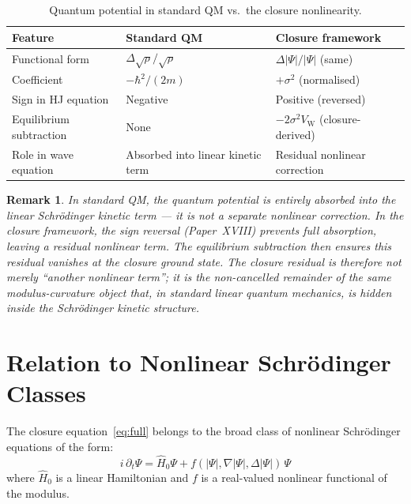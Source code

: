 \documentclass[12pt]{article}
\newtheorem{remark}[theorem]{Remark}
\newcommand{\VW}{V_{\mathrm{W}}}
\begin{document}
\begin{table}[ht]
\centering
\caption{Quantum potential in standard QM vs.\ the closure nonlinearity.}
\label{tab:qp}
\begin{tabular}{@{}lll@{}}
\toprule
Feature & Standard QM & Closure framework \\
\midrule
Functional form & $\Delta\sqrt\rho/\sqrt\rho$ & $\Delta|\Psi|/|\Psi|$ (same) \\
Coefficient & $-\hbar^2/(2m)$ & $+\sigma^2$ (normalised) \\
Sign in HJ equation & Negative & Positive (reversed) \\
Equilibrium subtraction & None & $-2\sigma^2\VW$ (closure-derived) \\
Role in wave equation & Absorbed into linear kinetic term & Residual nonlinear correction \\
\bottomrule
\end{tabular}
\end{table}

\begin{remark}
In standard QM, the quantum potential is entirely absorbed into the linear Schr\"odinger kinetic term --- it is not a separate nonlinear correction. In the closure framework, the sign reversal (Paper~XVIII) prevents full absorption, leaving a residual nonlinear term. The equilibrium subtraction then ensures this residual vanishes at the closure ground state. The closure residual is therefore not merely ``another nonlinear term''; it is the non-cancelled remainder of the same modulus-curvature object that, in standard linear quantum mechanics, is hidden inside the Schr\"odinger kinetic structure.
\end{remark}

\section{Relation to Nonlinear Schr\"odinger Classes}\label{sec:NLS}

The closure equation~\eqref{eq:full} belongs to the broad class of nonlinear Schr\"odinger equations of the form:
\begin{equation}\label{eq:general_NLS}
    i\,\partial_t\Psi = \hat{H}_0\Psi + f(|\Psi|, \nabla|\Psi|, \Delta|\Psi|)\,\Psi
\end{equation}
where $\hat{H}_0$ is a linear Hamiltonian and $f$ is a real-valued nonlinear functional of the modulus.
\end{document}
